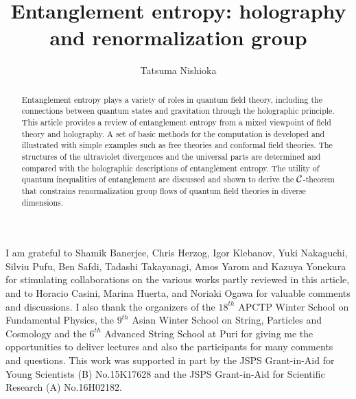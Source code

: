 \documentclass[rmp,reprint,amsmath,amssymb,longbibliography,floatfix,preprintnumbers]{revtex4-1}
\theoremstyle{plain}
\def\CC{{\cal C}}
\begin{document}
\title{Entanglement entropy: holography and renormalization group}

\author{Tatsuma Nishioka}

\begin{abstract}
Entanglement entropy plays a variety of roles in quantum field theory, including the connections between quantum states and gravitation through the holographic principle.
This article provides a review of entanglement entropy from a mixed viewpoint of field theory and holography.
A set of basic methods for the computation is developed and illustrated with simple examples such as free theories and conformal field theories.
The structures of the ultraviolet divergences and the universal parts are determined and compared with the holographic descriptions of entanglement entropy.
The utility of quantum inequalities of entanglement are discussed and shown to derive the $\CC$-theorem that constrains renormalization group flows of quantum field theories in diverse dimensions.
\end{abstract}

\maketitle
\tableofcontents{}


  
\begin{acknowledgments}
I am grateful to Shamik Banerjee, Chris Herzog, Igor Klebanov, Yuki Nakaguchi, Silviu Pufu, Ben Safdi, Tadashi Takayanagi, Amos Yarom and Kazuya Yonekura for stimulating collaborations on the various works partly reviewed in this article, and to Horacio Casini, Marina Huerta, and Noriaki Ogawa for valuable comments and discussions.
I also thank the organizers of the $18^{th}$ APCTP Winter School on Fundamental Physics, the $9^{th}$ Asian Winter School on String, Particles and Cosmology and the $6^{th}$ Advanced String School at Puri for giving me the opportunities to deliver lectures and also the participants for many comments and questions.
This work was supported in part by the JSPS Grant-in-Aid for Young Scientists (B) No.15K17628 and the JSPS Grant-in-Aid for Scientific Research (A) No.16H02182.
\end{acknowledgments}

\appendix
  


\end{document}
